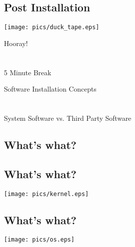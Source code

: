 \documentclass[xga]{xdvislides}
\begin{document}
\subsection{Post Installation}
\vspace*{\fill}
\begin{center}
	\texttt{[image: pics/duck\_tape.eps]}
\end{center}
\vspace*{\fill}

\newpage
\vspace*{\fill}
\begin{center}
    \Hugesize
        Hooray! \\ [1em]
    \hspace*{5mm}
    \blueline\\
    \hspace*{5mm}\\
        5 Minute Break
\end{center}
\vspace*{\fill}

\newpage
\vspace*{\fill}
\begin{center}
	\Hugesize
		Software Installation Concepts \\ [1em]
	\hspace*{5mm}
	\blueline\\
	\hspace*{5mm}\\
		System Software vs. Third Party Software
\end{center}
\vspace*{\fill}

\subsection{What's what?}
\subsection{What's what?}
\begin{center}
	\texttt{[image: pics/kernel.eps]}
\end{center}


\subsection{What's what?}
\begin{center}
	\texttt{[image: pics/os.eps]}
\end{center}
\end{document}
